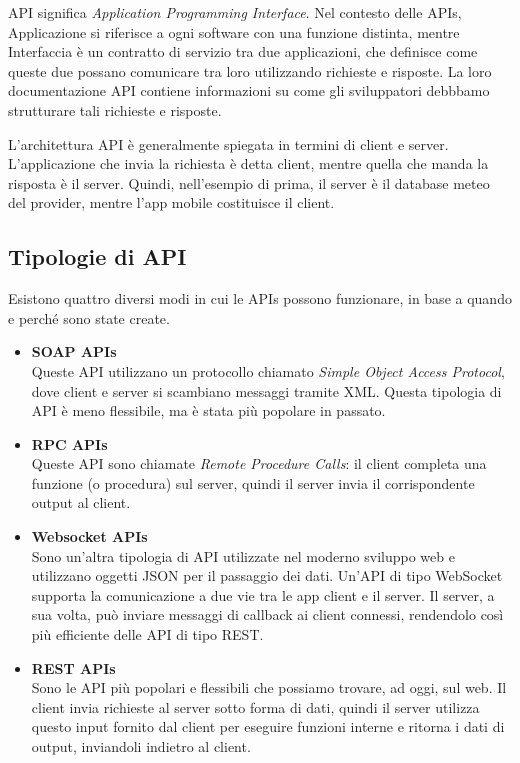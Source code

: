 API significa \textit{Application Programming Interface}. Nel contesto delle APIs, Applicazione si riferisce a ogni software con una funzione distinta, mentre Interfaccia è un contratto di servizio tra due applicazioni, che definisce come queste due possano comunicare tra loro utilizzando richieste e risposte. La loro documentazione API contiene informazioni su come gli sviluppatori debbbamo strutturare tali richieste e risposte.

L'architettura API è generalmente spiegata in termini di client e server. L'applicazione che invia la richiesta è detta client, mentre quella che manda la risposta è il server. Quindi, nell'esempio di prima, il server è il database meteo del provider, mentre l'app mobile costituisce il client.

\subsection{Tipologie di API}
Esistono quattro diversi modi in cui le APIs possono funzionare, in base a quando e perché sono state create.
\begin{itemize}
    \item \textbf{SOAP APIs}\\
    Queste API utilizzano un protocollo chiamato \textit{Simple Object Access Protocol}, dove client e server si scambiano messaggi tramite XML. Questa tipologia di API è meno flessibile, ma è stata più popolare in passato.
    \item \textbf{RPC APIs}\\
    Queste API sono chiamate \textit{Remote Procedure Calls}: il client completa una funzione (o procedura) sul server, quindi il server invia il corrispondente output al client.
    \item \textbf{Websocket APIs}\\
    Sono un'altra tipologia di API utilizzate nel moderno sviluppo web e utilizzano oggetti JSON per il passaggio dei dati. Un'API di tipo WebSocket supporta la comunicazione a due vie tra le app client e il server. Il server, a sua volta, può inviare messaggi di callback ai client connessi, rendendolo così più efficiente delle API di tipo REST.
    \item \textbf{REST APIs}\\
    Sono le API più popolari e flessibili che possiamo trovare, ad oggi, sul web. Il client invia richieste al server sotto forma di dati, quindi il server utilizza questo input fornito dal client per eseguire funzioni interne e ritorna i dati di output, inviandoli indietro al client.
\end{itemize}

